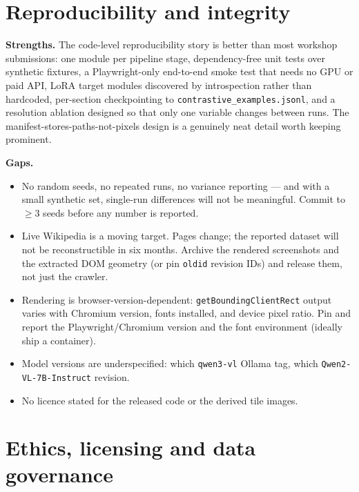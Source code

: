 \documentclass[11pt,a4paper]{article}
\begin{document}
\section{Reproducibility and integrity}

\textbf{Strengths.} The code-level reproducibility story is better than most workshop
submissions: one module per pipeline stage, dependency-free unit tests over synthetic
fixtures, a Playwright-only end-to-end smoke test that needs no GPU or paid API, LoRA target
modules discovered by introspection rather than hardcoded, per-section checkpointing to
\texttt{contrastive\_examples.jsonl}, and a resolution ablation designed so that only one
variable changes between runs. The manifest-stores-paths-not-pixels design is a genuinely
neat detail worth keeping prominent.

\textbf{Gaps.}
\begin{itemize}
\item No random seeds, no repeated runs, no variance reporting --- and with a small
      synthetic set, single-run differences will not be meaningful. Commit to $\geq 3$ seeds
      before any number is reported.
\item Live Wikipedia is a moving target. Pages change; the reported dataset will not be
      reconstructible in six months. Archive the rendered screenshots and the extracted DOM
      geometry (or pin \texttt{oldid} revision IDs) and release them, not just the crawler.
\item Rendering is browser-version-dependent: \texttt{getBoundingClientRect} output varies
      with Chromium version, fonts installed, and device pixel ratio. Pin and report the
      Playwright/Chromium version and the font environment (ideally ship a container).
\item Model versions are underspecified: which \texttt{qwen3-vl} Ollama tag, which
      \texttt{Qwen2-VL-7B-Instruct} revision.
\item No licence stated for the released code or the derived tile images.
\end{itemize}

\section{Ethics, licensing and data governance}
\end{document}

